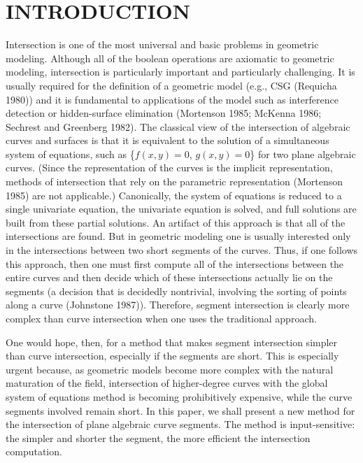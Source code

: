 \section{INTRODUCTION} 
Intersection is one of the most universal and basic problems in geometric modeling.
Although all of the boolean operations are axiomatic to geometric modeling, 
intersection is particularly important and particularly challenging.
It is usually required for the definition of a geometric model (e.g., CSG (Requicha 1980))  
and it is fundamental to applications of the model such as interference detection or 
hidden-surface elimination (Mortenson 1985; McKenna 1986; Sechrest and Greenberg 1982).
The classical view of the intersection of algebraic curves and surfaces is 
that it is equivalent to the solution of a 
simultaneous system of equations, such as \{$f(x,y)=0$, $g(x,y)=0$\} for two
plane algebraic curves.
(Since the representation of the curves is
	the implicit representation, methods of intersection that rely on 
	the parametric representation (Mortenson 1985) are not applicable.)
Canonically, the system of equations is reduced to a single univariate equation, 
the univariate equation is solved, and full solutions are built from these partial 
solutions.
An artifact of this approach is that all of the intersections are found.
But in geometric modeling one is usually interested only in the intersections
between two short segments of the curves.
Thus, if one follows this approach, then one must first compute 
all of the intersections between the entire curves
and then decide which of these intersections actually lie on the segments 
(a decision that is decidedly nontrivial, involving the sorting of 
points along a curve (Johnstone 1987)).
Therefore, segment intersection is clearly more complex than curve intersection
when one uses the traditional approach.

One would hope, then, for a method that makes segment intersection simpler than curve 
intersection, especially if the segments are short.
This is especially urgent because, as geometric models become more complex with 
the natural maturation of the field, intersection of higher-degree curves 
with the global system of equations method is becoming prohibitively expensive, 
while the curve segments involved remain short.
In this paper, we shall present a new method for the intersection of plane
algebraic curve segments.
The method is input-sensitive: the simpler and shorter the segment, 
the more efficient the intersection computation.

